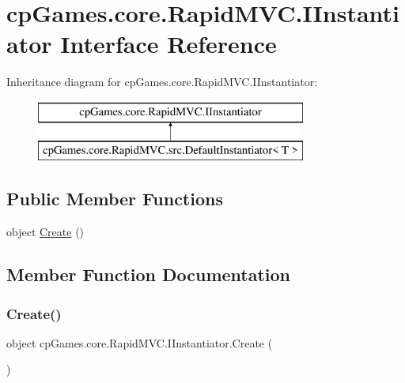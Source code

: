 \hypertarget{interfacecp_games_1_1core_1_1_rapid_m_v_c_1_1_i_instantiator}{}\section{cp\+Games.\+core.\+Rapid\+M\+V\+C.\+I\+Instantiator Interface Reference}
\label{interfacecp_games_1_1core_1_1_rapid_m_v_c_1_1_i_instantiator}
Inheritance diagram for cp\+Games.\+core.\+Rapid\+M\+V\+C.\+I\+Instantiator\+:\begin{figure}[H]
\begin{center}
\leavevmode
\includegraphics[height=2.000000cm]{interfacecp_games_1_1core_1_1_rapid_m_v_c_1_1_i_instantiator}
\end{center}
\end{figure}
\subsection*{Public Member Functions}
\begin{DoxyCompactItemize}
\item 
object \mbox{\hyperlink{interfacecp_games_1_1core_1_1_rapid_m_v_c_1_1_i_instantiator_a371da21e60164cf08f32fb39fb184584}{Create}} ()
\end{DoxyCompactItemize}


\subsection{Member Function Documentation}
\mbox{\label{interfacecp_games_1_1core_1_1_rapid_m_v_c_1_1_i_instantiator_a371da21e60164cf08f32fb39fb184584}} 
\subsubsection{\texorpdfstring{Create()}{Create()}}
{\footnotesize\ttfamily object cp\+Games.\+core.\+Rapid\+M\+V\+C.\+I\+Instantiator.\+Create (\begin{DoxyParamCaption}{ }\end{DoxyParamCaption})}



